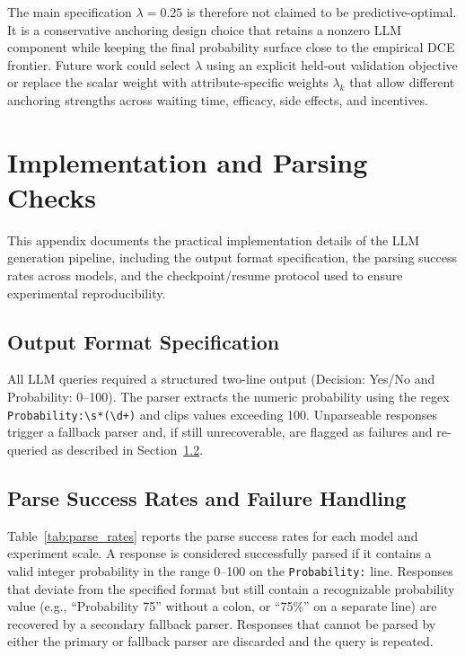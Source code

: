 \documentclass[11pt]{article}
\begin{document}
The main specification \(\lambda=0.25\) is therefore not claimed to be predictive-optimal. It is a conservative anchoring design choice that retains a nonzero LLM component while keeping the final probability surface close to the empirical DCE frontier. Future work could select \(\lambda\) using an explicit held-out validation objective or replace the scalar weight with attribute-specific weights \(\lambda_k\) that allow different anchoring strengths across waiting time, efficacy, side effects, and incentives.


\section{Implementation and Parsing Checks}
\label{app:implementation}

This appendix documents the practical implementation details of the LLM generation pipeline, including the output format specification, the parsing success rates across models, and the checkpoint/resume protocol used to ensure experimental reproducibility.

\subsection{Output Format Specification}
\label{app:output_format}

All LLM queries required a structured two-line output (Decision: Yes/No and Probability: 0--100). The parser extracts the numeric probability using the regex \texttt{Probability:\textbackslash s*(\textbackslash d+)} and clips values exceeding 100. Unparseable responses trigger a fallback parser and, if still unrecoverable, are flagged as failures and re-queried as described in Section~\ref{app:parse_handling}.

\subsection{Parse Success Rates and Failure Handling}
\label{app:parse_handling}

Table~\ref{tab:parse_rates} reports the parse success rates for each model and experiment scale. A response is considered successfully parsed if it contains a valid integer probability in the range 0--100 on the \texttt{Probability:} line. Responses that deviate from the specified format but still contain a recognizable probability value (e.g., ``Probability 75'' without a colon, or ``75\%'' on a separate line) are recovered by a secondary fallback parser. Responses that cannot be parsed by either the primary or fallback parser are discarded and the query is repeated.
\end{document}
